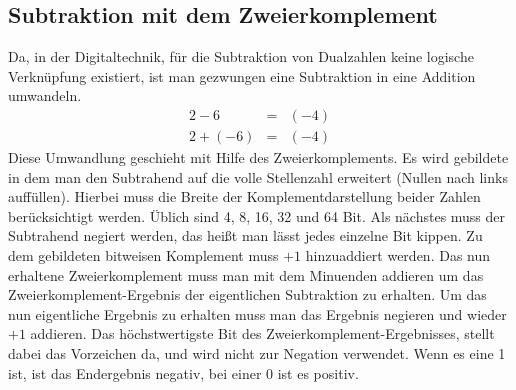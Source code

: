 \documentclass[a4paper,12pt,fleqn,oneside]{article}
\begin{document}
	\subsection{Subtraktion mit dem Zweierkomplement}	
		Da, in der Digitaltechnik, für die Subtraktion von Dualzahlen keine logische Verknüpfung existiert, ist man gezwungen eine 				Subtraktion in eine Addition umwandeln. 
		\[ \begin{array}{rcl}
   				 2 - 6       & = & (-4)			\\
  			         2 + (-6)   & = & (-4)	
		\end{array} \]
		\vspace{\baselineskip}
		Diese Umwandlung geschieht mit Hilfe des Zweierkomplements. Es wird gebildete in dem man den Subtrahend auf die volle 		Stellenzahl erweitert (Nullen nach links auffüllen). Hierbei muss die Breite der Komplementdarstellung beider Zahlen 					berücksichtigt werden. Üblich sind 4, 8, 16, 32 und 64 Bit. Als nächstes muss der Subtrahend negiert werden, das heißt 				man lässt jedes einzelne Bit kippen. Zu dem gebildeten bitweisen Komplement muss $+ 1$ hinzuaddiert werden. Das nun 				erhaltene Zweierkomplement muss man mit dem Minuenden addieren um das Zweierkomplement-Ergebnis der eigentlichen 			Subtraktion zu erhalten. Um das nun eigentliche Ergebnis zu erhalten muss man das Ergebnis negieren und wieder $+ 1$ 				addieren. Das höchstwertigste Bit des Zweierkomplement-Ergebnisses, stellt dabei das Vorzeichen da, und wird nicht zur 				Negation verwendet. Wenn es eine 1 ist, ist das Endergebnis negativ, bei einer 0 ist es positiv. \\
		\\
		
\newpage		
		
\end{document}
